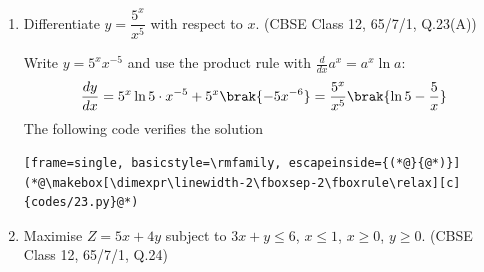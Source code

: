 \begin{enumerate}[label=\thesubsection.\arabic*, ref=\thesubsection.\theenumi]
\solution
The trace and determinant are
\begin{align}
	\text{tr}\brak{\vec{A}} = 2 + 2 = 4, \qquad \abs{\vec{A}} = 2\brak{2} - 3\brak{-1} = 7
\end{align}
The characteristic polynomial of a $2\times2$ matrix is $\lambda^2 - \text{tr}\brak{\vec{A}}\lambda + \abs{\vec{A}}$, so
\begin{align}
	\lambda^2 - 4\lambda + 7 = 0 \implies \lambda = \frac{4 \pm \sqrt{16-28}}{2} = 2 \pm i\sqrt{3}
\end{align}
The eigenvalues sum to $4$ (the trace) and multiply to $7$ (the determinant). By the Cayley--Hamilton theorem, $\vec{A}$ satisfies its own characteristic equation:
\begin{align}
	\vec{A}^2 - 4\vec{A} + 7\vec{I} = \vec{0}
\end{align}
Direct verification: $\vec{A}^2 = \myvec{1 & 12 \\ -4 & 1}$, $4\vec{A} = \myvec{8 & 12 \\ -4 & 8}$, $7\vec{I} = \myvec{7 & 0 \\ 0 & 7}$, so
\begin{align}
	\vec{A}^2 - 4\vec{A} + 7\vec{I} = \myvec{1-8+7 & 12-12 \\ -4+4 & 1-8+7} = \myvec{0 & 0 \\ 0 & 0}
\end{align}
The following code verifies the solution
\begin{lstlisting}[frame=single, basicstyle=\rmfamily, escapeinside={(*@}{@*)}]
(*@\makebox[\dimexpr\linewidth-2\fboxsep-2\fboxrule\relax][c]{codes/22.c}@*)
\end{lstlisting}

\item
Differentiate $y = \dfrac{5^x}{x^5}$ with respect to $x$.
\hfill (CBSE Class 12, 65/7/1, Q.23(A))

\solution
Write $y = 5^x x^{-5}$ and use the product rule with $\frac{d}{dx}a^x = a^x\ln a$:
\begin{align}
	\frac{dy}{dx} = 5^x\ln 5\cdot x^{-5} + 5^x\brak{-5x^{-6}} = \frac{5^x}{x^5}\brak{\ln 5 - \frac{5}{x}}
\end{align}
The following code verifies the solution
\begin{lstlisting}[frame=single, basicstyle=\rmfamily, escapeinside={(*@}{@*)}]
(*@\makebox[\dimexpr\linewidth-2\fboxsep-2\fboxrule\relax][c]{codes/23.py}@*)
\end{lstlisting}

\item
Maximise $Z = 5x + 4y$ subject to $3x + y \le 6$, $x \le 1$, $x \ge 0$, $y \ge 0$.
\hfill (CBSE Class 12, 65/7/1, Q.24)


\end{enumerate}
